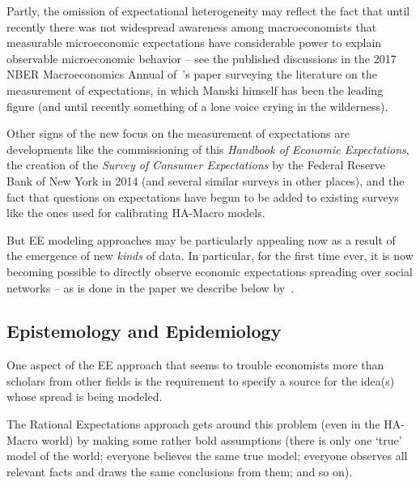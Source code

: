     Partly, the omission of expectational heterogeneity may reflect the fact that until recently there was not widespread awareness among macroeconomists that measurable microeconomic expectations have considerable power to explain observable microeconomic behavior -- see the published discussions in the 2017 NBER Macroeconomics Annual of~\cite{manski2017survey}'s paper surveying the literature on the measurement of expectations, in which Manski himself has been the leading figure (and until recently something of a lone voice crying in the wilderness).%

    Other signs of the new focus on the measurement of expectations are developments like the commissioning of this \emph{Handbook of Economic Expectations}, the creation of the \emph{Survey of Consumer Expectations} by the Federal Reserve Bank of New York in 2014 %
    (and several similar surveys in other places), and the fact that questions on expectations have begun to be added to existing surveys like the ones used for calibrating HA-Macro models.  %

    But EE modeling approaches may be particularly appealing now as a result of the emergence of new \emph{kinds} of data.  In particular, for the first time ever, it is now becoming possible to directly observe economic expectations spreading over social networks -- as is done in the paper we describe below by~\cite{bailey2018economic}.

\subsection{Epistemology and Epidemiology}

    One aspect of the EE approach that seems to trouble economists more than scholars from other fields is the requirement to specify a source for the idea(s) whose spread is being modeled.

    The Rational Expectations approach gets around this problem (even in the HA-Macro world) by making some rather bold assumptions (there is only one `true' model of the world; everyone believes the same true model; everyone observes all relevant facts and draws the same conclusions from them; and so on).  %


